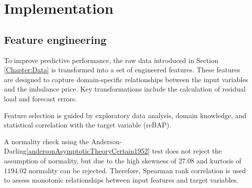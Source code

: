 \documentclass[class=scrbook, crop=false]{standalone}
\begin{document}
\chapter{Implementation} %
\label{Chapter::Implementation}

\section{Feature engineering}
\label{Section::Feature_engineering}
To improve predictive performance, the raw data introduced in Section \ref{Chapter:Data} is transformed into a set of engineered features. These features are designed to capture domain-specific relationships between the input variables and the imbalance price. Key transformations include the calculation of residual load and forecast errors.

Feature selection is guided by exploratory data analysis, domain knowledge, and statistical correlation with the target variable (\gls{reBAP}).

A normality check using the Anderson-Darling\ref{andersonAsymptoticTheoryCertain1952} test does not reject the assumption of normality, but due to the high skewness of $27.08$ and kurtosis of $1194.02$ normality can be rejected. Therefore, Spearman rank correlation is used to assess monotonic relationships between input features and target variables.




\end{document}
